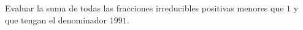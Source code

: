 Evaluar la suma de todas las fracciones irreducibles positivas menores que $1$ y que tengan el denominador $1991$.
